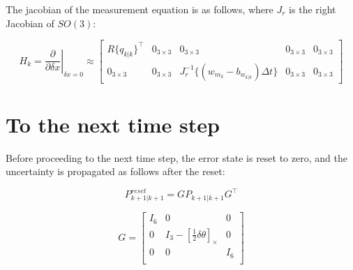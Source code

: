 \documentclass[]{article}
\newcommand*\eval[3]{\left.#1\right\rvert_{#2}^{#3}}
\begin{document}
The jacobian of the measurement equation is as follows, where $J_r$ is the right Jacobian of $SO(3)$:

\begin{equation}
H_k = 
\eval{\frac{\partial}{\partial \delta x}}{\delta x = 0}{} \approx
\begin{bmatrix}
R\{q_{k|k}\}^{\intercal} & 0_{3 \times 3} &                             0_{3 \times 3} & 0_{3 \times 3} & 0_{3 \times 3} \\
          0_{3 \times 3} & 0_{3 \times 3} & J_r^{-1}\{(w_{m_k}-b_{w_{k|k}}) \Delta t\} & 0_{3 \times 3} & 0_{3 \times 3}
\end{bmatrix}
\end{equation}

\section{To the next time step}
Before proceeding to the next time step, the error state is reset to zero, and the uncertainty is propagated as follows after the reset:

\begin{equation}P_{k+1|k+1}^{reset} = G P_{k+1|k+1} G^{\intercal}\end{equation} 

\begin{equation}G = 
\begin{bmatrix}
I_6  &    0                                        & 0   \\
  0  & I_3 - [\frac{1}{2} \delta \theta]_{\times}  & 0  \\
  0  &    0                                        & I_6  \\
\end{bmatrix}
\end{equation}
\end{document}
